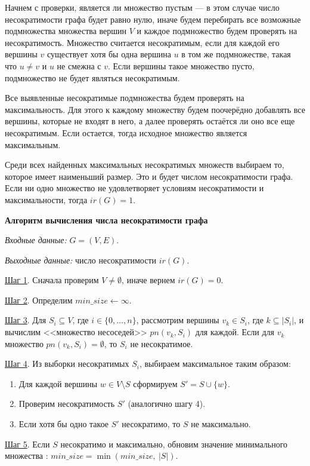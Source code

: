 \documentclass[bachelor, och, nir]{SCWorks}
\begin{document}
Начнем с проверки, является ли множество пустым — в этом случае число несократимости графа будет равно нулю, иначе будем перебирать все возможные подмножества множества вершин $V$ и каждое подмножество будем проверять на несократимость. Множество считается несократимым, если для каждой его вершины $v$ существует хотя бы одна вершина $u$ в том же подмножестве, такая что $u \neq v$ и $u$ не смежна с $v$. Если вершины такое множество пусто, подмножество не будет являться несократимым.

Все выявленные несократимые подмножества будем проверять на максимальность. Для этого к каждому множеству будем поочерёдно добавлять все вершины, которые не входят в него, а далее проверять остаётся ли оно все еще несократимым. Если остается, тогда исходное множество является максимальным.

Среди всех найденных максимальных несократимых множеств выбираем то, которое имеет наименьший размер. Это и будет числом несократимости графа. Если ни одно множество не удовлетворяет условиям несократимости и максимальности, тогда $ir(G) = 1$.
\vspace{1em}

\textbf{Алгоритм вычисления числа несократимости графа}

\textit{Входные данные:} $G = (V, E)$.

\textit{Выходные данные:} число несократимости $ir(G)$.

\underline{Шаг 1}. Сначала проверим $V \neq \emptyset$, иначе вернем $ir(G) = 0$.

\underline{Шаг 2}. Определим $min\_size \leftarrow \infty$.

\underline{Шаг 3}. Для $S_i \subseteq V$, где $i \in \{0, \dots, n\}$, рассмотрим вершины $v_k \in S_i$, где $k \subseteq |S_i|$, и вычислим <<множество несоседей>> $pn(v_k, S_i)$ для каждой. Если для $v_k$ множество $pn(v_k, S_i) = \emptyset$, то $S_i$ не несократимое.

\underline{Шаг 4}. Из выборки несократимых $S_i$, выбираем максимальное таким образом:
\begin{enumerate}
    \item Для каждой вершины $w \in V \setminus S$ сформируем $S' = S \cup \{w\}$.
    \item Проверим несократимость  $S'$ (аналогично шагу 4).
    \item Если хотя бы одно такое $S'$ несократимо, то $S$ не максимально.
\end{enumerate}

\underline{Шаг 5}. Если $S$ несократимо и максимально, обновим значение минимального множества : $min\_size = \min(min\_size,\ |S|)$.
\end{document}
